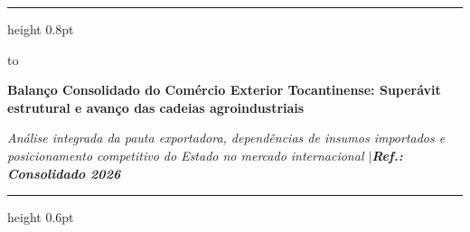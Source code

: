\documentclass[10pt,a4paper]{article}
\begin{document}
\color{cinzatexto}

%
\par\vspace{2pt}%
{\color{coracento}\hrule height 0.8pt}%
\par\vspace{6pt}%
\noindent\hbox to %
\par\vspace{5pt}%
{\fontsize{14.5}{17.4}\selectfont\bfseries\color{corprimaria}Balanço Consolidado do Comércio Exterior Tocantinense: Superávit estrutural e avanço das cadeias agroindustriais\par}%
\vspace{3pt}%
{\footnotesize\itshape\color{cinzasub}Análise integrada da pauta exportadora, dependências de insumos importados e posicionamento competitivo do Estado no mercado internacional \enspace$\vert$\enspace \textbf{\color{corprimaria}Ref.: Consolidado 2026}\par}%
\par\vspace{6pt}%
{\color{cinzaborda}\hrule height 0.6pt}%

\vspace{0.12cm}
\end{document}
